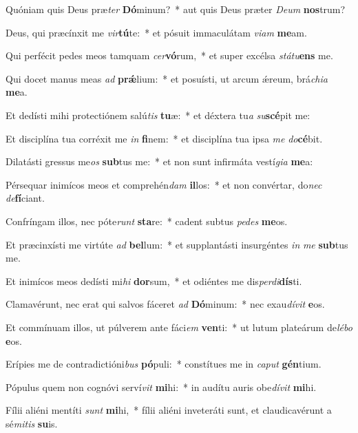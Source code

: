 \item Quóniam quis Deus præ\textit{ter} \textbf{Dó}minum?~* aut quis Deus præter \textit{De}\textit{um} \textbf{nos}trum?
\item Deus, qui præcínxit me \textit{vir}\textbf{tú}te:~* et pósuit immaculátam \textit{vi}\textit{am} \textbf{me}am.
\item Qui perfécit pedes meos tamquam \textit{cer}\textbf{vó}rum,~* et super excélsa \textit{stá}\textit{tu}\textbf{ens} me.
\item Qui docet manus meas \textit{ad} \textbf{prǽ}lium:~* et posuísti, ut arcum ǽreum, brá\textit{chi}\textit{a} \textbf{me}a.
\item Et dedísti mihi protectiónem salú\textit{tis} \textbf{tu}æ:~* et déxtera tu\textit{a} \textit{su}\textbf{scé}pit me:
\item Et disciplína tua corréxit me \textit{in} \textbf{fi}nem:~* et disciplína tua ipsa \textit{me} \textit{do}\textbf{cé}bit.
\item Dilatásti gressus me\textit{os} \textbf{sub}tus me:~* et non sunt infirmáta vestí\textit{gi}\textit{a} \textbf{me}a:
\item Pérsequar inimícos meos et comprehén\textit{dam} \textbf{il}los:~* et non convértar, do\textit{nec} \textit{de}\textbf{fí}ciant.
\item Confríngam illos, nec póte\textit{runt} \textbf{sta}re:~* cadent subtus \textit{pe}\textit{des} \textbf{me}os.
\item Et præcinxísti me virtúte \textit{ad} \textbf{bel}lum:~* et supplantásti insurgéntes \textit{in} \textit{me} \textbf{sub}tus me.
\item Et inimícos meos dedísti mi\textit{hi} \textbf{dor}sum,~* et odiéntes me dis\textit{per}\textit{di}\textbf{dís}ti.
\item Clamavérunt, nec erat qui salvos fáceret \textit{ad} \textbf{Dó}minum:~* nec exau\textit{dí}\textit{vit} \textbf{e}os.
\item Et commínuam illos, ut púlverem ante fáci\textit{em} \textbf{ven}ti:~* ut lutum plateárum de\textit{lé}\textit{bo} \textbf{e}os.
\item Erípies me de contradictióni\textit{bus} \textbf{pó}puli:~* constítues me in \textit{ca}\textit{put} \textbf{gén}tium.
\item Pópulus quem non cognóvi serví\textit{vit} \textbf{mi}hi:~* in audítu auris obe\textit{dí}\textit{vit} \textbf{mi}hi.
\item Fílii aliéni mentíti \textit{sunt} \textbf{mi}hi,~* fílii aliéni inveteráti sunt, et claudicavérunt a sé\textit{mi}\textit{tis} \textbf{su}is.
